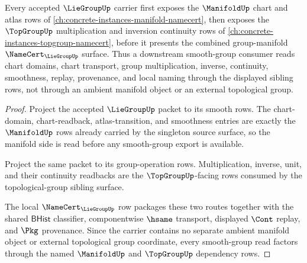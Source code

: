\begin{theorem}
\label{thm:liegroup-manifold-topgroup-dependency-route}
Every accepted $\LieGroupUp$ carrier first exposes the $\ManifoldUp$ chart and atlas rows of \autoref{ch:concrete-instances-manifold-namecert}, then exposes the $\TopGroupUp$ multiplication and inversion continuity rows of \autoref{ch:concrete-instances-topgroup-namecert}, before it presents the combined group-manifold $\NameCert_{\LieGroupUp}$ surface. Thus a downstream smooth-group consumer reads chart domains, chart transport, group multiplication, inverse, continuity, smoothness, replay, provenance, and local naming through the displayed sibling rows, not through an ambient manifold object or an external topological group.
\end{theorem}
\begin{proof}
Project the accepted $\LieGroupUp$ packet to its smooth rows. The chart-domain, chart-readback, atlas-transition, and smoothness entries are exactly the $\ManifoldUp$ rows already carried by the singleton source surface, so the manifold side is read before any smooth-group export is available.

Project the same packet to its group-operation rows. Multiplication, inverse, unit, and their continuity readbacks are the $\TopGroupUp$-facing rows consumed by the topological-group sibling surface.

The local $\NameCert_{\LieGroupUp}$ row packages these two routes together with the shared $\mathsf{BHist}$ classifier, componentwise $\hsame$ transport, displayed $\Cont$ replay, and $\Pkg$ provenance. Since the carrier contains no separate ambient manifold object or external topological group coordinate, every smooth-group read factors through the named $\ManifoldUp$ and $\TopGroupUp$ dependency rows.
\end{proof}
